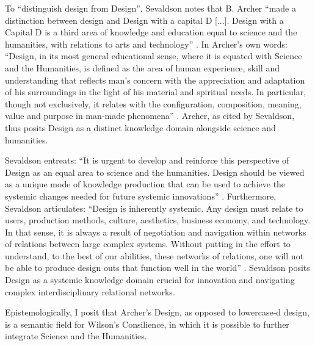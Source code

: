To ``distinguish design from Design”, Sevaldson notes that B. Archer “made a distinction between design and Design with a capital D [...]. Design with a Capital D is a third area of knowledge and education equal to science and the humanities, with relations to arts and technology” \citep[p. 91]{sevaldson_designing_2022}. In Archer’s own words: ``Design, in its most general educational sense, where it is equated with Science and the Humanities, is defined as the area of human experience, skill and understanding that reflects man’s concern with the appreciation and adaptation of his surroundings in the light of his material and spiritual needs. In particular, though not exclusively, it relates with the configuration, composition, meaning, value and purpose in man-made phenomena” \citep[p. 20]{archer_design_1979}. Archer, as cited by Sevaldson, thus posits Design as a distinct knowledge domain alongside science and humanities.

Sevaldson entreats: ``It is urgent to develop and reinforce this perspective of Design as an equal area to science and the humanities. Design should be viewed as a unique mode of knowledge production that can be used to achieve the systemic changes needed for future systemic innovations” \citep[p. 91]{sevaldson_designing_2022}. Furthermore, Sevaldson articulates: ``Design is inherently systemic. Any design must relate to users, production methods, culture, aesthetics, business economy, and technology. In that sense, it is always a result of negotiation and navigation within networks of relations between large complex systems. Without putting in the effort to understand, to the best of our abilities, these networks of relations, one will not be able to produce design outs that function well in the world” \citep[p. 91]{sevaldson_designing_2022}. Sevaldson posits Design as a systemic knowledge domain crucial for innovation and navigating complex interdisciplinary relational networks.

Epistemologically, I posit that Archer's Design, as opposed to lowercase-d design, is a semantic field for Wilson's Consilience, in which it is possible to further integrate Science and the Humanities.
